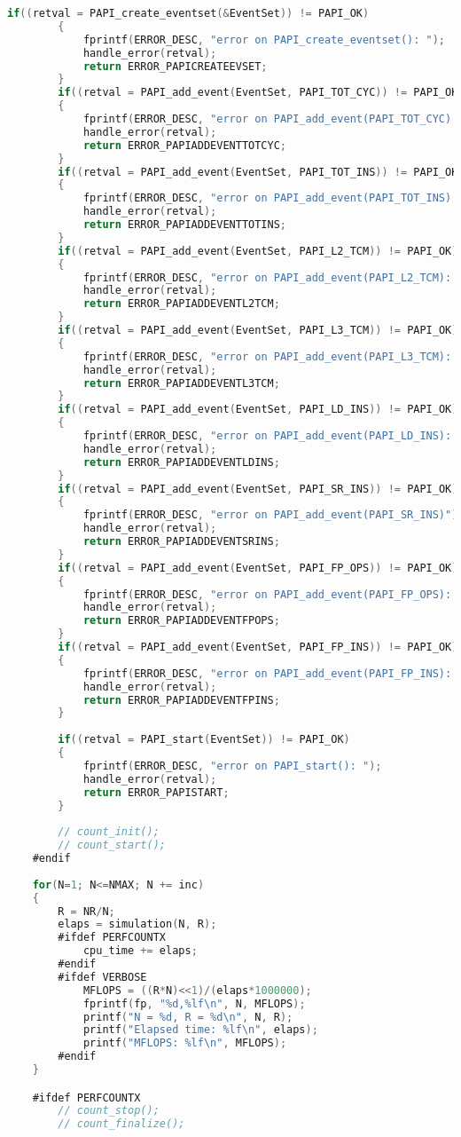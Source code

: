 \begin{lstlisting}[language=C,breaklines=true]
		if((retval = PAPI_create_eventset(&EventSet)) != PAPI_OK)
		{
			fprintf(ERROR_DESC, "error on PAPI_create_eventset(): ");
			handle_error(retval);	
			return ERROR_PAPICREATEEVSET;
		}
		if((retval = PAPI_add_event(EventSet, PAPI_TOT_CYC)) != PAPI_OK)
		{
			fprintf(ERROR_DESC, "error on PAPI_add_event(PAPI_TOT_CYC): ");	
			handle_error(retval);				
			return ERROR_PAPIADDEVENTTOTCYC;
		}
		if((retval = PAPI_add_event(EventSet, PAPI_TOT_INS)) != PAPI_OK)
		{
			fprintf(ERROR_DESC, "error on PAPI_add_event(PAPI_TOT_INS): ");
			handle_error(retval);	
			return ERROR_PAPIADDEVENTTOTINS;
		}
		if((retval = PAPI_add_event(EventSet, PAPI_L2_TCM)) != PAPI_OK)
		{
			fprintf(ERROR_DESC, "error on PAPI_add_event(PAPI_L2_TCM): ");
			handle_error(retval);		
			return ERROR_PAPIADDEVENTL2TCM;
		}
		if((retval = PAPI_add_event(EventSet, PAPI_L3_TCM)) != PAPI_OK)
		{
			fprintf(ERROR_DESC, "error on PAPI_add_event(PAPI_L3_TCM): ");
			handle_error(retval);	
			return ERROR_PAPIADDEVENTL3TCM;
		}
		if((retval = PAPI_add_event(EventSet, PAPI_LD_INS)) != PAPI_OK)
		{
			fprintf(ERROR_DESC, "error on PAPI_add_event(PAPI_LD_INS): ");
			handle_error(retval);	
			return ERROR_PAPIADDEVENTLDINS;
		}
		if((retval = PAPI_add_event(EventSet, PAPI_SR_INS)) != PAPI_OK)
		{
			fprintf(ERROR_DESC, "error on PAPI_add_event(PAPI_SR_INS)");
			handle_error(retval);	
			return ERROR_PAPIADDEVENTSRINS;
		}
		if((retval = PAPI_add_event(EventSet, PAPI_FP_OPS)) != PAPI_OK)
		{
			fprintf(ERROR_DESC, "error on PAPI_add_event(PAPI_FP_OPS): ");
			handle_error(retval);	
			return ERROR_PAPIADDEVENTFPOPS;
		}	
		if((retval = PAPI_add_event(EventSet, PAPI_FP_INS)) != PAPI_OK)
		{
			fprintf(ERROR_DESC, "error on PAPI_add_event(PAPI_FP_INS): ");
			handle_error(retval);	
			return ERROR_PAPIADDEVENTFPINS;	
		}
	
		if((retval = PAPI_start(EventSet)) != PAPI_OK)
		{
			fprintf(ERROR_DESC, "error on PAPI_start(): ");
			handle_error(retval);	
			return ERROR_PAPISTART;
		}
	
		// count_init();
		// count_start();
	#endif
	
	for(N=1; N<=NMAX; N += inc)
	{
		R = NR/N;
		elaps = simulation(N, R);
		#ifdef PERFCOUNTX
			cpu_time += elaps;
		#endif
		#ifdef VERBOSE		
			MFLOPS = ((R*N)<<1)/(elaps*1000000);
			fprintf(fp, "%d,%lf\n", N, MFLOPS);
			printf("N = %d, R = %d\n", N, R);
			printf("Elapsed time: %lf\n", elaps);
			printf("MFLOPS: %lf\n", MFLOPS);
		#endif
	}

	#ifdef PERFCOUNTX
		// count_stop();
		// count_finalize();
	

\end{lstlisting}
